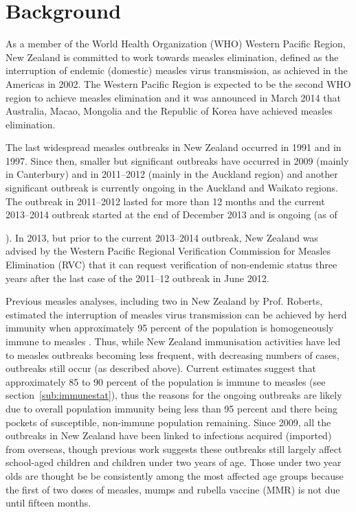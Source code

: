 \documentclass{article}
\begin{document}
\section{Background}

As a member of the World Health Organization (WHO) Western Pacific Region, New Zealand is committed to work towards measles elimination, defined as the interruption of endemic (domestic) measles virus transmission, as achieved in the Americas in 2002. The Western Pacific Region is expected to be the second WHO region to  achieve measles elimination and it was announced in March 2014 that Australia, Macao, Mongolia and the Republic of Korea have achieved measles elimination.

The last widespread measles outbreaks in New Zealand occurred in 1991 and in 1997. Since then, smaller but significant outbreaks have occurred in 2009 (mainly in Canterbury) and in 2011--2012 (mainly in the Auckland region) and another significant outbreak is currently ongoing in the Auckland and Waikato regions. The outbreak in 2011--2012 lasted for more than 12 months and the current 2013--2014 outbreak started at the end of December 2013 and is ongoing (as of \date{3 July 2014}). In 2013, but prior to the current 2013--2014 outbreak, New Zealand was advised by the Western Pacific Regional Verification Commission for Measles Elimination (RVC) that it can request verification of non-endemic status three years after the last case of the 2011--12 outbreak in June 2012.

Previous measles analyses, including two in New Zealand by Prof. Roberts, estimated the interruption of measles virus transmission can be achieved by herd immunity when approximately 95 percent of the population is homogeneously immune to measles \citep{roberts0,roberts4}. Thus, while New Zealand immunisation activities have led to measles outbreaks becoming less frequent, with decreasing numbers of cases, outbreaks still occur (as described above). Current estimates suggest that approximately 85 to 90 percent of the population is immune to measles (see section~\autoref{sub:immunestat}), thus the reasons for the ongoing outbreaks are likely due to overall population immunity being less than 95 percent and there being pockets of susceptible, non-immune population remaining. Since 2009, all the outbreaks in New Zealand have been linked to infections acquired (imported) from overseas, though previous work suggests these outbreaks still largely affect school-aged children and children under two years of age. Those under two year olds are thought be be consistently among the most affected age groups because the first of two doses of measles, mumps and rubella vaccine (MMR) is not due until fifteen months.
\end{document}
